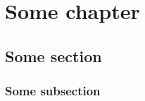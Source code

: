 \documentclass{memoir}
\begin{document}
\tableofcontents
\chapter{Some chapter}
\section{Some section}
\subsection{Some subsection}
\end{document}
